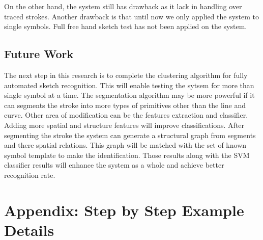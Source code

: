  On the other hand, the system still has drawback as it lack in handling over traced strokes.  Another drawback is that until now we only applied the system to single symbols.  Full free hand sketch test has not been applied on the system. %

\newpage

\section{Future Work}
\label{sec:FutureWork}


The next step in this research is to complete the clustering algorithm for fully automated sketch recognition. This will enable testing the sytsem for more than single symbol at a time. The segmentation algorithm may be more powerful if it can segments the stroke into more types of primitives other than the line and curve. Other area of modification can be the features extraction and classifier. Adding more spatial and structure features will improve classifications. After segmenting the stroke the system can generate a structural graph from segments and there spatial relations. This graph will be matched with the set of known symbol template to make the identification. Those results along with the SVM classifier results will enhance the system as a whole and achieve better recognition rate.  %
\appendix
\chapter{Appendix: Step by Step Example Details}
\label{ChapterstepExample}%


